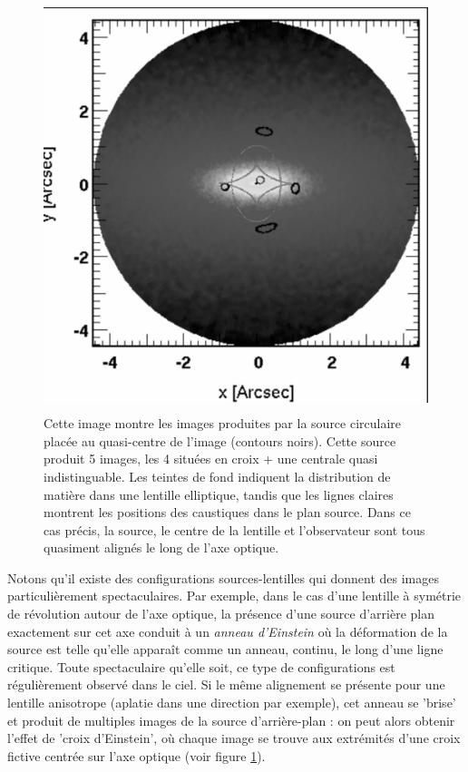 \begin{figure}[htbp]
	\centering
		\includegraphics[height=12cm]{figs/SPL.png}
	\caption[Exemple de calcul de lentilles gravitationnelles]{Cette image montre les images produites par la source circulaire placée au quasi-centre de l'image (contours noirs). Cette source produit 5 images, les 4 situées en croix + une centrale quasi indistinguable. Les teintes de fond indiquent la distribution de matière dans une lentille elliptique, tandis que les lignes claires montrent les positions des caustiques dans le plan source. Dans ce cas précis, la source, le centre de la lentille et l'observateur sont tous quasiment alignés le long de l'axe optique.} 
	\label{f:SPL}
\end{figure}

Notons qu'il existe des configurations sources-lentilles qui donnent des images particulièrement spectaculaires. Par exemple, dans le cas d'une lentille à symétrie de révolution autour de l'axe optique, la présence d'une source d'arrière plan exactement sur cet axe conduit à un \textit{anneau d'Einstein} où la déformation de la source est telle qu'elle apparaît comme un anneau, continu, le long d'une ligne critique. Toute spectaculaire qu'elle soit, ce type de configurations est régulièrement observé dans le ciel. Si le même alignement se présente pour une lentille anisotrope (aplatie dans une direction par exemple), cet anneau se 'brise' et produit de multiples images de la source d'arrière-plan : on peut alors obtenir l'effet de 'croix d'Einstein', où chaque image se trouve aux extrémités d'une croix fictive centrée sur l'axe optique (voir figure \ref{f:SPL}).


